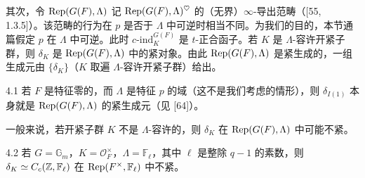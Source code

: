 其次，令 $\operatorname{Rep}(G(F),\Lambda)$ 记 $\operatorname{Rep}(G(F),\Lambda)^{\heartsuit}$ 的（无界）$\infty$-导出范畴（[55, 1.3.5]）。该范畴的行为在 $p$ 是否于 $\Lambda$ 中可逆时相当不同。为我们的目的，本节通篇假定 $p$ 在 $\Lambda$ 中可逆。此时 $c\text{-ind}^{G(F)}_{K}$ 是 $t$-正合函子。若 $K$ 是 $\Lambda$-容许开紧子群，则 $\delta_K$ 是 $\operatorname{Rep}(G(F),\Lambda)$ 中的紧对象。由此 $\operatorname{Rep}(G(F),\Lambda)$ 是紧生成的，一组生成元由 $\{\delta_K\}$（$K$ 取遍 $\Lambda$-容许开紧子群）给出。
\begin{rem}{4.1}
若 $F$ 是特征零的，而 $\Lambda$ 是特征 $p$ 的域（这不是我们考虑的情形），则 $\delta_{I(1)}$ 本身就是 $\operatorname{Rep}(G(F),\Lambda)$ 的紧生成元（见 [64]）。
\end{rem}

一般来说，若开紧子群 $K$ 不是 $\Lambda$-容许的，则 $\delta_K$ 在 $\operatorname{Rep}(G(F),\Lambda)$ 中可能不紧。
\begin{exam}{4.2}
若 $G=\mathbb G_m$，$K=\mathcal O_F^{\times}$，$\Lambda=\mathbb F_{\ell}$，其中 $\ell$ 是整除 $q-1$ 的素数，则 $\delta_K\simeq C_c(\mathbb{Z},\mathbb F_{\ell})$ 在 $\operatorname{Rep}(F^{\times},\mathbb F_{\ell})$ 中不紧。
\end{exam}

